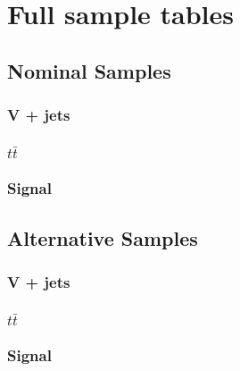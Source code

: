 \chapter{Full sample tables}
\label{app:full-nominal-samples}
\section{Nominal Samples}
\subsection{V + jets}



\subsection{\texorpdfstring{$t\bar{t}$}{tt}}

\subsection{Signal}


\section{Alternative Samples}
\subsection{V + jets}


\subsection{\texorpdfstring{$t\bar{t}$}{tt}}

\subsection{Signal}
